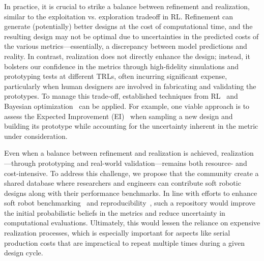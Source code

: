 In practice, it is crucial to strike a balance between refinement and realization, similar to the exploitation vs. exploration tradeoff in RL. Refinement can generate (potentially) better designs at the cost of computational time, and the resulting design may not be optimal due to uncertainties in the predicted costs of the various metrics—essentially, a discrepancy between model predictions and reality. In contrast, realization does not directly enhance the design; instead, it bolsters our confidence in the metrics through high-fidelity simulations and prototyping tests at different \glspl{TRL}, often incurring significant expense, particularly when human designers are involved in fabricating and validating the prototypes. To manage this trade-off, established techniques from \gls{RL}~\citep{sutton1998reinforcement} and Bayesian optimization~\citep{garnett2023bayesian} can be applied. For example, one viable approach is to assess the Expected Improvement (EI)~\citep{jones1998efficient} when sampling a new design and building its prototype while accounting for the uncertainty inherent in the metric under consideration.

Even when a balance between refinement and realization is achieved, realization—through prototyping and real-world validation—remains both resource- and cost-intensive. To address this challenge, we propose that the community create a shared database where researchers and engineers can contribute soft robotic designs along with their performance benchmarks. In line with efforts to enhance soft robot benchmarking~\citep{bhatia2021evolution, wang2023softzoo} and reproducibility~\citep{baines2024need}, such a repository would improve the initial probabilistic beliefs in the metrics and reduce uncertainty in computational evaluations. Ultimately, this would lessen the reliance on expensive realization processes, which is especially important for aspects like serial production costs that are impractical to repeat multiple times during a given design cycle.